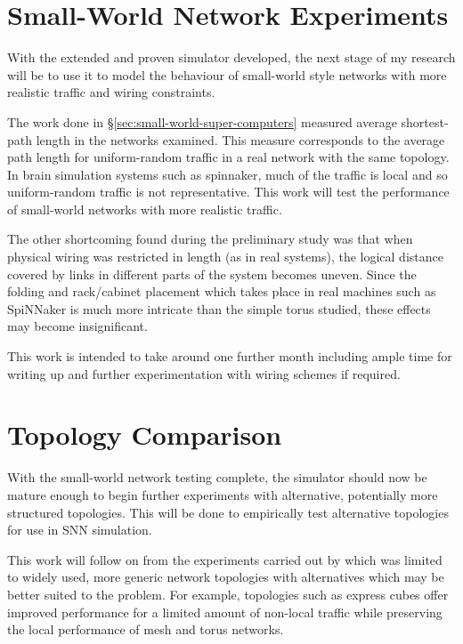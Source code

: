 	
	\section{Small-World Network Experiments}
		
		With the extended and proven simulator developed, the next stage of my
		research will be to use it to model the behaviour of small-world style
		networks with more realistic traffic and wiring constraints.
		
		The work done in \S\ref{sec:small-world-super-computers} measured average
		shortest-path length in the networks examined. This measure corresponds to
		the average path length for uniform-random traffic in a real network with
		the same topology. In brain simulation systems such as spinnaker, much of
		the traffic is local and so uniform-random traffic is not representative.
		This work will test the performance of small-world networks with more
		realistic traffic.
		
		The other shortcoming found during the preliminary study was that when
		physical wiring was restricted in length (as in real systems), the logical
		distance covered by links in different parts of the system becomes uneven.
		Since the folding and rack/cabinet placement which takes place in real
		machines such as SpiNNaker is much more intricate than the simple torus
		studied, these effects may become insignificant.
		
		This work is intended to take around one further month including ample time
		for writing up and further experimentation with wiring schemes if required.
	
	
	\section{Topology Comparison}
		
		
		With the small-world network testing complete, the simulator should now be
		mature enough to begin further experiments with alternative, potentially
		more structured topologies. This will be done to empirically test
		alternative topologies for use in SNN simulation.
		
		This work will follow on from the experiments carried out by
		\cite{vainbrand11} which was limited to widely used, more generic network
		topologies with alternatives which may be better suited to the problem. For
		example, topologies such as express cubes \cite{dally91} offer improved
		performance for a limited amount of non-local traffic while preserving the
		local performance of mesh and torus networks.
	
